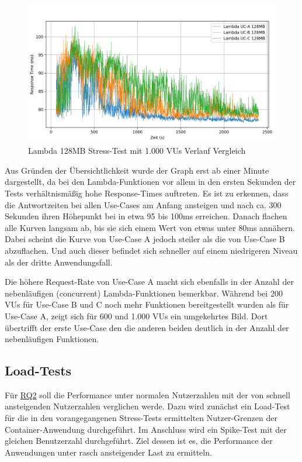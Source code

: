 \begin{figure}[H]
    \includegraphics[width=\textwidth]{img/lambda128-stress1000-comparison-graph.png}
    \caption[Lambda 128MB Stress-Test mit 1.000 VUs Verlauf Vergleich]{Lambda 128MB Stress-Test mit 1.000 VUs Verlauf Vergleich}
    \label{fig:lambda128-stress1000-comparison-graph}
\end{figure}

Aus Gründen der Übersichtlichkeit wurde der Graph erst ab einer Minute dargestellt, da bei den Lambda-Funktionen vor allem in den ersten Sekunden der Tests verhältnismäßig hohe Response-Times auftreten. Es ist zu erkennen, dass die Antwortzeiten bei allen Use-Cases am Anfang ansteigen und nach ca. 300 Sekunden ihren Höhepunkt bei in etwa 95 bis 100ms erreichen. Danach flachen alle Kurven langsam ab, bis sie sich einem Wert von etwas unter 80ms annähern. Dabei scheint die Kurve von Use-Case A jedoch steiler als die von Use-Case B abzuflachen. Und auch dieser befindet sich schneller auf einem niedrigeren Niveau als der dritte Anwendungsfall.

Die höhere Request-Rate von Use-Case A macht sich ebenfalls in der Anzahl der nebenläufigen (concurrent) Lambda-Funktionen bemerkbar. Während bei 200 \acp{VU} für Use-Case B und C noch mehr Funktionen bereitgestellt wurden als für Use-Case A, zeigt sich für 600 und 1.000 \acp{VU} ein umgekehrtes Bild. Dort übertrifft der erste Use-Case den die anderen beiden deutlich in der Anzahl der nebenläufigen Funktionen. 

\subsection{Load-Tests}
Für \hyperref[tab:research-questions]{RQ2} soll die Performance unter normalen Nutzerzahlen mit der von schnell ansteigenden Nutzerzahlen verglichen werde. Dazu wird zunächst ein Load-Test für die in den vorangegangenen Stress-Tests ermittelten Nutzer-Grenzen der Container-Anwendung durchgeführt. Im Anschluss wird ein Spike-Test mit der gleichen Benutzerzahl durchgeführt. Ziel dessen ist es, die Performance der Anwendungen unter rasch ansteigender Last zu ermitteln. 

